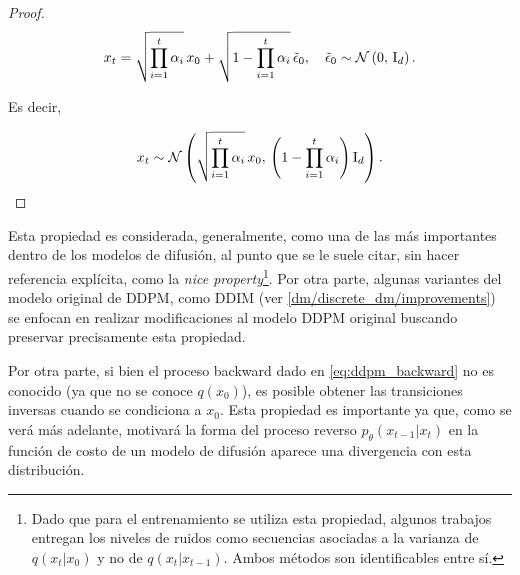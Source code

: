 \begin{proof}
    \begin{equation*}
        x_t = \sqrt{\prod_{i=1}^t \alpha_i}\, x_0 + \sqrt{1-\prod_{i=1}^t \alpha_i}\, \tilde{\epsilon}_0,
        \quad\tilde{\epsilon}_0\sim\mathcal{N}\left(0,\,\operatorname{I}_{d}\right).
    \end{equation*}

    Es decir,

    \begin{equation*}
        x_t\sim\mathcal{N}\left(\sqrt{\prod_{i=1}^t \alpha_i}\, x_0,\,\left(1-\prod_{i=1}^t \alpha_i\right)\operatorname{I}_{d}\right).
    \end{equation*}
\end{proof}

Esta propiedad es considerada, generalmente, como una de las más importantes dentro de los modelos de difusión, al punto que se le suele citar, sin hacer referencia explícita, como la \textit{nice property}\footnote{Dado que para el entrenamiento se utiliza esta propiedad, algunos trabajos entregan los niveles de ruidos como secuencias asociadas a la varianza de $q(x_t|x_0)$ y no de $q(x_{t}|x_{t-1})$. Ambos métodos son identificables entre sí.}. Por otra parte, algunas variantes del modelo original de DDPM, como DDIM (ver \autoref{dm/discrete_dm/improvements}) se enfocan en realizar modificaciones al modelo DDPM original buscando preservar precisamente esta propiedad.

Por otra parte, si bien el proceso backward dado en \eqref{eq:ddpm_backward} no es conocido (ya que no se conoce $q(x_0)$), es posible obtener las transiciones inversas cuando se condiciona a $x_0$. Esta propiedad es importante ya que, como se verá más adelante, motivará la forma del proceso reverso $p_\theta(x_{t-1}|x_t)$ en la función de costo de un modelo de difusión aparece una divergencia con esta distribución.

